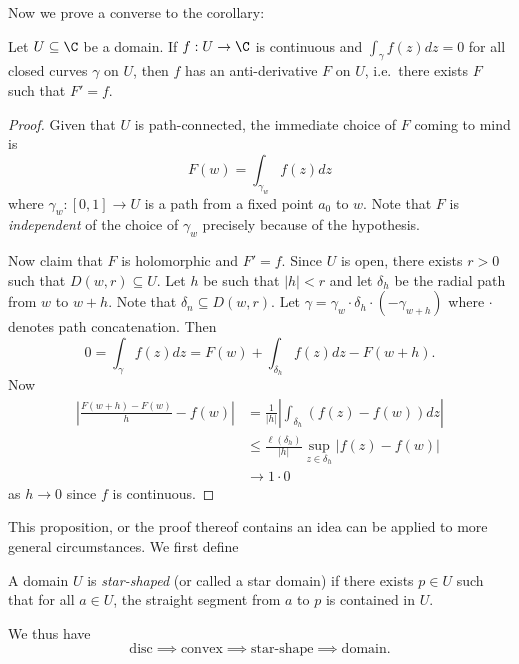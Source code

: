 \documentclass[a4paper]{article}
\begin{document}
Now we prove a converse to the corollary:

\begin{proposition}
  \label{prop:existence of anti-derivative}
  Let \(U \subseteq \C\) be a domain. If \(f: U \to \C\) is continuous and \(\int_\gamma f(z)dz = 0\) for all closed curves \(\gamma\) on \(U\), then \(f\) has an anti-derivative \(F\) on \(U\), i.e.\ there exists \(F\) such that \(F' = f\).
\end{proposition}

\begin{proof}
  Given that \(U\) is path-connected, the immediate choice of \(F\) coming to mind is
  \[
    F(w) = \int_{\gamma_w} f(z)dz
  \]
  where \(\gamma_w: [0, 1] \to U\) is a path from a fixed point \(a_0\) to \(w\). Note that \(F\) is \emph{independent} of the choice of \(\gamma_w\) precisely because of the hypothesis.

  Now claim that \(F\) is holomorphic and \(F' = f\). Since \(U\) is open, there exists \(r > 0\) such that \(D(w, r) \subseteq U\). Let \(h\) be such that \(|h| < r\) and let \(\delta_h\) be the radial path from \(w\) to \(w + h\). Note that \(\delta_n \subseteq D(w, r)\). Let \(\gamma = \gamma_w \cdot \delta_h \cdot (-\gamma_{w + h})\) where \(\cdot\) denotes path concatenation. Then
  \[
    0 = \int_\gamma f(z) dz = F(w) + \int_{\delta_h} f(z)dz - F(w + h).
  \]
  Now
  \begin{align*}
    \left| \frac{F(w + h) - F(w)}{h} - f(w) \right|
    &= \frac{1}{|h|} \left| \int_{\delta_h} (f(z) - f(w)) dz \right| \\
    &\leq \frac{\ell(\delta_h)}{|h|} \sup_{z \in \delta_h} |f(z) - f(w)| \\
    &\to 1 \cdot 0
  \end{align*}
  as \(h \to 0\) since \(f\) is continuous.
\end{proof}

This proposition, or the proof thereof contains an idea can be applied to more general circumstances. We first define

\begin{definition}
  A domain \(U\) is \emph{star-shaped} (or called a star domain) if there exists \(p \in U\) such that for all \(a \in U\), the straight segment from \(a\) to \(p\) is contained in \(U\).
\end{definition}

We thus have
\[
  \text{disc} \implies \text{convex} \implies \text{star-shape} \implies \text{domain}.
\]
\end{document}
